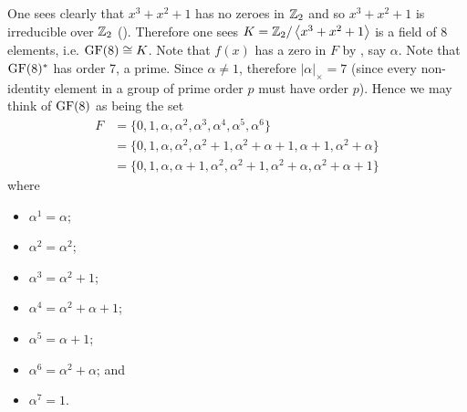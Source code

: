 \begin{example}\label{example-GF8-analysis}
    One sees clearly that $x^3 + x^2 + 1$ has no zeroes in $\mathbb{Z}_2$ and so $x^3 + x^2 + 1$ is irreducible over $\mathbb{Z}_2$ (). Therefore one sees $K = \mathbb{Z}_2/\left\langle x^3+x^2+1\right\rangle$ is a field of 8 elements, i.e. $\mathrm{GF}(8) \cong K$. Note that $f(x)$ has a zero in $F$ by , say $\alpha$. Note that $\mathrm{GF}(8)^\ast$ has order 7, a prime. Since $\alpha \neq 1$, therefore $|\alpha|_\times = 7$ (since every non-identity element in a group of prime order $p$ must have order $p$). Hence we may think of $\mathrm{GF}(8)$ as being the set
    \begin{align*}
        F &= \{0, 1, \alpha, \alpha^2, \alpha^3, \alpha^4, \alpha^5, \alpha^6\}\\
        &= \{0, 1, \alpha, \alpha^2, \alpha^2 + 1, \alpha^2 + \alpha + 1, \alpha + 1, \alpha^2 + \alpha\}\\
        &= \{0, 1, \alpha, \alpha + 1, \alpha^2, \alpha^2 + 1, \alpha^2 + \alpha, \alpha^2 + \alpha + 1\}
    \end{align*}
    where
    \begin{multicols}{2}
        \begin{itemize}
            \item $\alpha^1 = \alpha$;
            \item $\alpha^2 = \alpha^2$;
            \item $\alpha^3 = \alpha^2 + 1$;
            \item $\alpha^4 = \alpha^2 + \alpha + 1$;
            \item $\alpha^5 = \alpha + 1$;
            \item $\alpha^6 = \alpha^2 + \alpha$; and
            \item $\alpha^7 = 1$.
        \end{itemize}
    \end{multicols}


\end{example}
